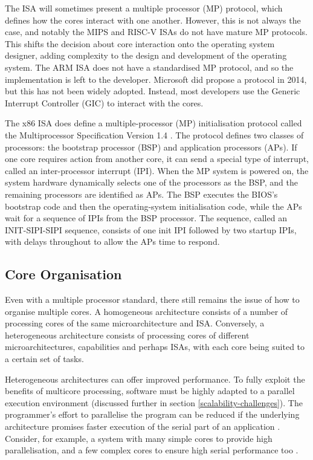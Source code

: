 \documentclass[bsc,frontabs,twoside,singlespacing,parskip,deptreport]{infthesis}     %
\begin{document}
The ISA will sometimes present a multiple processor (MP) protocol, which defines how the cores interact with one another. However, this is not always the case, and notably the MIPS and RISC-V ISAs do not have mature MP protocols. This shifts the decision about core interaction onto the operating system designer, adding complexity to the design and development of the operating system. The ARM ISA does not have a standardised MP protocol, and so the implementation is left to the developer. Microsoft did propose a protocol in 2014, but this has not been widely adopted. Instead, most developers use the Generic Interrupt Controller (GIC) to interact with the cores.

The x86 ISA does define a multiple-processor (MP) initialisation protocol called the Multiprocessor Specification Version 1.4 \cite{intel-sys-prog-guide}. The protocol defines two classes of processors: the bootstrap processor (BSP) and application processors (APs). If one core requires action from another core, it can send a special type of interrupt, called an inter-processor interrupt (IPI). When the MP system is powered on, the system hardware dynamically selects one of the processors as the BSP, and the remaining processors are identified as APs. The BSP executes the BIOS’s bootstrap code and then the operating-system initialisation code, while the APs wait for a sequence of IPIs from the BSP processor. The sequence, called an INIT-SIPI-SIPI sequence, consists of one init IPI followed by two startup IPIs, with delays throughout to allow the APs time to respond.

\subsection{Core Organisation}
Even with a multiple processor standard, there still remains the issue of how to organise multiple cores. A homogeneous architecture consists of a number of processing cores of the same microarchitecture and ISA. Conversely, a heterogeneous architecture consists of processing cores of different microarchitectures, capabilities and perhaps ISAs, with each core being suited to a certain set of tasks.

Heterogeneous architectures can offer improved performance. To fully exploit the benefits of multicore processing, software must be highly adapted to a parallel execution environment (discussed further in section \ref{scalability-challenges}). The programmer's effort to parallelise the program can be reduced if the underlying architecture promises faster execution of the serial part of an application \cite{suleman_2007}. Consider, for example, a system with many simple cores to provide high parallelisation, and a few complex cores to ensure high serial performance too \cite{balakrishnan_2005}. 
\end{document}
